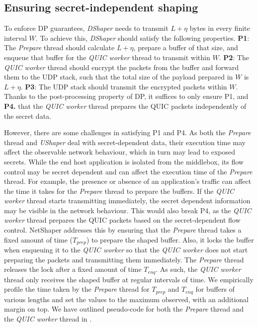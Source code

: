 \subsection{Ensuring secret-independent shaping}
\label{subsed:netshaper-secret-independent-shaping-implementation}

To enforce DP guarantees, \textit{DShaper} needs to transmit $L + \eta$ bytes in every finite interval $W$.
To achieve this, \textit{DShaper} should satisfy the following properties.
\textbf{P1}: The \textit{Prepare} thread should calculate $L + \eta$, prepare a buffer of that size, and enqueue that buffer for the \textit{QUIC worker} thread to transmit within $W$.
\textbf{P2}: The \textit{QUIC worker} thread should encrypt the packets from the buffer and forward them to the UDP stack, such that the total size of the payload prepared in $W$ is $L + \eta$.
\textbf{P3}: The UDP stack should transmit the encrypted packets within $W$.
Thanks to the post-processing property of DP, it suffices to only ensure P1, and \textbf{P4.} that the \textit{QUIC worker} thread prepares the QUIC packets independently of the secret data.

However, there are some challenges in satisfying P1 and P4.
As both the \textit{Prepare} thread and \textit{UShaper} deal with secret-dependent data, their execution time may affect the observable network behaviour, which in turn may lead to exposed secrets.
While the end host application is isolated from the middlebox, its flow control may be secret dependent and can affect the execution time of the \textit{Prepare} thread.
For example, the presence or absence of an application's traffic can affect the time it takes for the \textit{Prepare} thread to prepare the buffers.
If the \textit{QUIC worker} thread starts transmitting immediately, the secret dependent information may be visible in the network behaviour. 
This would also break P4, as the \textit{QUIC worker} thread prepares the QUIC packets based on the secret-dependent flow control.
NetShaper addresses this by ensuring that the \textit{Prepare} thread takes a fixed amount of time ($T_{prep}$) to prepare the shaped buffer.
Also, it locks the buffer when enqueuing it to the \textit{QUIC worker} so that the \textit{QUIC worker} does not start preparing the packets and transmitting them immediately.
The \textit{Prepare} thread releases the lock after a fixed amount of time $T_{enq}$.
As such, the \textit{QUIC worker} thread only receives the shaped buffer at regular intervals of time.
We empirically profile the time taken by the \textit{Prepare} thread for $T_{prep}$ and $T_{enq}$ for buffers of various lengths and set the values to the maximum observed, with an additional margin on top.
We have outlined pseudo-code for both the \textit{Prepare} thread and the \textit{QUIC worker} thread in .


